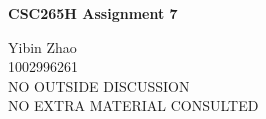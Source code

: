 \documentclass[10pt]{article}
\begin{document}
\begin{center}
{\bf \Large \bf CSC265H Assignment 7}
\end{center}

\noindent
Yibin Zhao\\
1002996261\\
NO OUTSIDE DISCUSSION\\
NO EXTRA MATERIAL CONSULTED\\

\begin{comment}
	Consider the DISJOINT SET data sturcture that represents each set by a tree, 
	preform LINK(x, y) by making y a child of x, and use path compression during FIND-SET.

	For any node x, let w(x) denote the number of nodes in the subtree rooted at x.
\end{comment}
\end{document}

